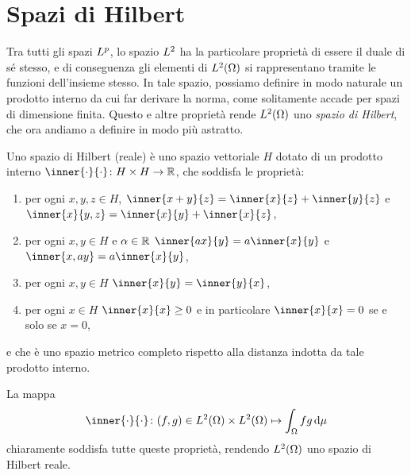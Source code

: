 \section{Spazi di Hilbert}
Tra tutti gli spazi $\lclass[p]$, lo spazio $\lclass[2]$ ha la particolare proprietà di essere il duale di s\'e stesso, e di conseguenza gli elementi di $\leb[2]{\Omega}$ si rappresentano tramite le funzioni dell'insieme stesso.
In tale spazio, possiamo definire in modo naturale un prodotto interno da cui far derivare la norma, come solitamente accade per spazi di dimensione finita.
Questo e altre proprietà rende $\leb[2]{\Omega}$ uno \emph{spazio di Hilbert}, che ora andiamo a definire in modo più astratto.
\begin{definizione} \label{d:spazio-hilbert}
    Uno spazio di Hilbert (reale) è uno spazio vettoriale $H$ dotato di un prodotto interno $\inner{\cdot}{\cdot}\colon H\times H\to\R$, che soddisfa le proprietà:
    \begin{enumerate}
        \item per ogni $x,y,z\in H$, $\inner{x+y}{z}=\inner{x}{z}+\inner{y}{z}$ e $\inner{x}{y,z}=\inner{x}{y}+\inner{x}{z}$,
        \item per ogni $x,y\in H$ e $\alpha\in\R$ $\inner{ax}{y}=a\inner{x}{y}$ e $\inner{x,ay}=a\inner{x}{y}$,
        \item per ogni $x,y\in H$ $\inner{x}{y}=\inner{y}{x}$,
        \item per ogni $x\in H$ $\inner{x}{x}\ge 0$ e in particolare $\inner{x}{x}=0$ se e solo se $x=0$,
    \end{enumerate}
    e che è uno spazio metrico completo rispetto alla distanza indotta da tale prodotto interno. 
\end{definizione}
La mappa
\begin{equation}
    \inner{\cdot}{\cdot}\colon(f,g)\in\leb[2]{\Omega}\times\leb[2]{\Omega}\mapsto\int_\Omega fg\,\dd\mu
    \label{eq:prodotto-interno-L2}
\end{equation}
chiaramente soddisfa tutte queste proprietà, rendendo $\leb[2]{\Omega}$ uno spazio di Hilbert reale.

